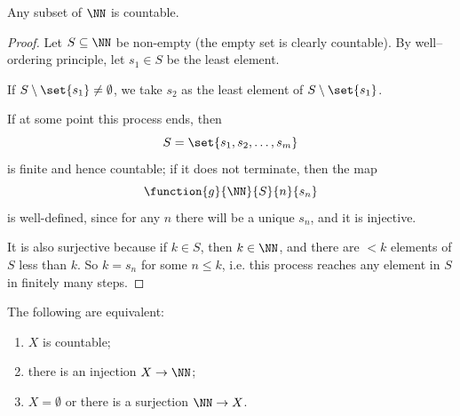 \begin{lemma}
    Any subset of \(\NN\) is countable.
\end{lemma}

\begin{proof}
    Let \(S \subseteq \NN\) be non-empty (the empty set is clearly countable). By well--ordering principle, let \(s_1 \in S\) be the least element.

    If \(S \setminus \set{s_1} \neq \emptyset\), we take \(s_2\) as the least element of \(S \setminus \set{s_1}\).

    If at some point this process ends, then
    \[
        S = \set{s_1, s_2, \ldots, s_m}
    \]
    is finite and hence countable; if it does not terminate, then the map
    \[
        \function{g}{\NN}{S}{n}{s_n}
    \]
    is well-defined, since for any \(n\) there will be a unique \(s_n\), and it is injective.

    It is also surjective because if \(k \in S\), then \(k \in \NN\), and there are \(< k\) elements of \(S\) less than \(k\). So \(k = s_n\) for some \(n \leq k\), i.e. this process reaches any element in \(S\) in finitely many steps.
\end{proof}

\begin{theorem}
    The following are equivalent:
    \begin{enumerate}
        \item \(X\) is countable;
        \item there is an injection \(X \to \NN\);
        \item \(X = \emptyset\) or there is a surjection \(\NN \to X\).
    \end{enumerate}
\end{theorem}

